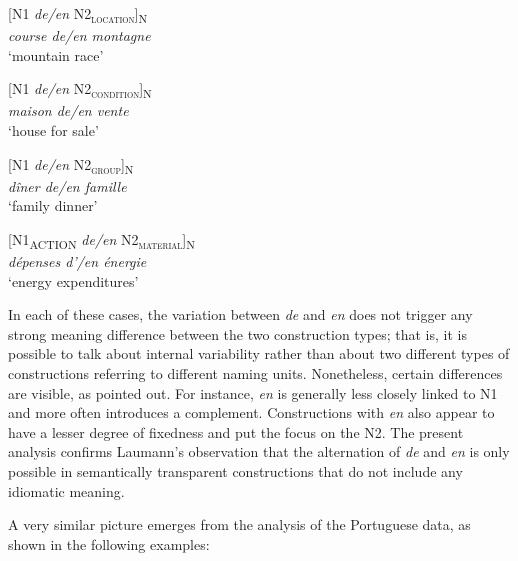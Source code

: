 \documentclass[output=paper]{langsci/langscibook}
\begin{document}
\begin{exe}\ex\begin{minipage}[t]{0.4\textwidth}
[N1 \textit{de/en} N2\textsubscript{\scshape location}]\textsubscript{N}\\
\textit{course de/en montagne}\\
`mountain race'
\end{minipage}\hfill
\begin{minipage}[t]{0.45\textwidth}
[N1 \textit{de/en} N2\textsubscript{\scshape condition}]\textsubscript{N}\\
\textit{maison de/en vente}\\
`house for sale'
\end{minipage}
\end{exe}

\begin{exe}\ex\begin{minipage}[t]{0.4\textwidth}
[N1 \textit{de/en} N2\textsubscript{\scshape group}]\textsubscript{N}\\
\textit{dîner de/en famille}\\
`family dinner'
\end{minipage}\hfill
\begin{minipage}[t]{0.45\textwidth}
[N1\textsubscript{ACTION} \textit{de/en} N2\textsubscript{\scshape material}]\textsubscript{N}\\
\textit{dépenses d'/en énergie }\\
`energy expenditures'
\end{minipage}
\end{exe}

In each of these cases, the variation between \textit{de} and \textit{en} does not trigger any strong meaning difference between the two construction types; that is, it is possible to talk about internal variability rather than about two different types of constructions referring to different naming units. Nonetheless, certain differences are visible, as \citet{Laumann:1998} pointed out. For instance, \textit{en} is generally less closely linked to N1 and more often introduces a complement. Constructions with \textit{en} also appear to have a lesser degree of fixedness and put the focus on the N2. The present analysis confirms Laumann’s observation that the alternation of \textit{de} and \textit{en} is only possible in semantically transparent constructions that do not include any idiomatic meaning.  

A very similar picture emerges from the analysis of the Portuguese data, as shown in the following examples:
\end{document}
